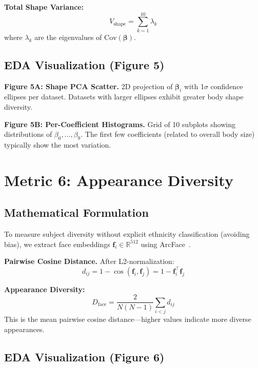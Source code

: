 \documentclass[runningheads]{llncs}
\newcommand{\R}{\mathbb{R}}
\newcommand{\Cov}{\mathrm{Cov}}
\newcommand{\bvec}[1]{\bm{#1}}
\begin{document}
\textbf{Total Shape Variance:}
\begin{equation}
    V_{\text{shape}} = \sum_{k=1}^{10} \lambda_k
\end{equation}
where $\lambda_k$ are the eigenvalues of $\Cov(\bvec{\beta})$.

\subsection{EDA Visualization (Figure 5)}

\textbf{Figure 5A: Shape PCA Scatter.} 2D projection of $\bvec{\beta}_i$ with 1$\sigma$ confidence ellipses per dataset. Datasets with larger ellipses exhibit greater body shape diversity.

\textbf{Figure 5B: Per-Coefficient Histograms.} Grid of 10 subplots showing distributions of $\beta_0, \ldots, \beta_9$. The first few coefficients (related to overall body size) typically show the most variation.


\section{Metric 6: Appearance Diversity}
\label{sec:m6_appearance}

\subsection{Mathematical Formulation}

To measure subject diversity without explicit ethnicity classification (avoiding bias), we extract face embeddings $\bvec{f}_i \in \R^{512}$ using ArcFace~\cite{deng2019arcface}.

\textbf{Pairwise Cosine Distance.} After L2-normalization:
\begin{equation}
    d_{ij} = 1 - \cos(\bvec{f}_i, \bvec{f}_j) = 1 - \bvec{f}_i^\top \bvec{f}_j
\end{equation}

\textbf{Appearance Diversity:}
\begin{equation}
    D_{\text{face}} = \frac{2}{N(N-1)} \sum_{i < j} d_{ij}
\end{equation}
This is the mean pairwise cosine distance---higher values indicate more diverse appearances.

\subsection{EDA Visualization (Figure 6)}
\end{document}

